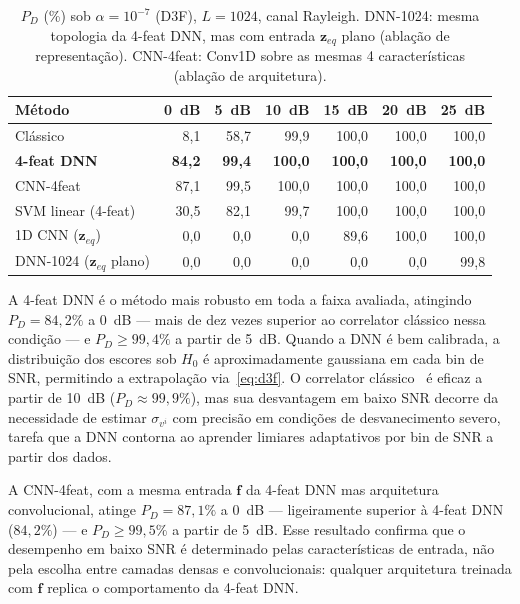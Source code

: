 \documentclass{sbrt}
\begin{document}
\begin{table}[htb]
\caption{\label{tab:resultados}$P_D$ (\%) sob $\alpha = 10^{-7}$ (D3F), $L=1024$, canal Rayleigh. DNN-1024: mesma topologia da 4-feat DNN, mas com entrada $\mathbf{z}_{eq}$ plano (ablação de representação). CNN-4feat: Conv1D sobre as mesmas 4 características (ablação de arquitetura).}
\begin{center}
\begin{tabular}{lrrrrrr}\toprule
Método & 0~dB & 5~dB & 10~dB & 15~dB & 20~dB & 25~dB \\\midrule
Clássico~\cite{ref_xie}          &  8{,}1 & 58{,}7 & 99{,}9 & 100{,}0 & 100{,}0 & 100{,}0 \\
\textbf{4-feat DNN}               & \textbf{84{,}2} & \textbf{99{,}4} & \textbf{100{,}0} & \textbf{100{,}0} & \textbf{100{,}0} & \textbf{100{,}0} \\
CNN-4feat                         & 87{,}1 & 99{,}5 & 100{,}0 & 100{,}0 & 100{,}0 & 100{,}0 \\
SVM linear (4-feat)               & 30{,}5 & 82{,}1 & 99{,}7 & 100{,}0 & 100{,}0 & 100{,}0 \\
1D CNN ($\mathbf{z}_{eq}$)~\cite{ref_liao} &  0{,}0 &  0{,}0 &  0{,}0 &  89{,}6 & 100{,}0 & 100{,}0 \\
DNN-1024 ($\mathbf{z}_{eq}$ plano) &  0{,}0 &  0{,}0 &  0{,}0 &   0{,}0 &   0{,}0 &  99{,}8 \\\bottomrule
\end{tabular}
\end{center}
\end{table}

A 4-feat DNN é o método mais robusto em toda a faixa avaliada, atingindo $P_D = 84{,}2\%$ a 0~dB — mais de dez vezes superior ao correlator clássico nessa condição — e $P_D \geq 99{,}4\%$ a partir de 5~dB. Quando a DNN é bem calibrada, a distribuição dos escores sob $H_0$ é aproximadamente gaussiana em cada bin de SNR, permitindo a extrapolação via~\eqref{eq:d3f}. O correlator clássico~\cite{ref_xie} é eficaz a partir de 10~dB ($P_D \approx 99{,}9\%$), mas sua desvantagem em baixo SNR decorre da necessidade de estimar $\sigma_{v^i}$ com precisão em condições de desvanecimento severo, tarefa que a DNN contorna ao aprender limiares adaptativos por bin de SNR a partir dos dados.

A CNN-4feat, com a mesma entrada $\mathbf{f}$ da 4-feat DNN mas arquitetura convolucional, atinge $P_D = 87{,}1\%$ a 0~dB — ligeiramente superior à 4-feat DNN ($84{,}2\%$) — e $P_D \geq 99{,}5\%$ a partir de 5~dB. Esse resultado confirma que o desempenho em baixo SNR é determinado pelas características de entrada, não pela escolha entre camadas densas e convolucionais: qualquer arquitetura treinada com $\mathbf{f}$ replica o comportamento da 4-feat DNN.
\end{document}
